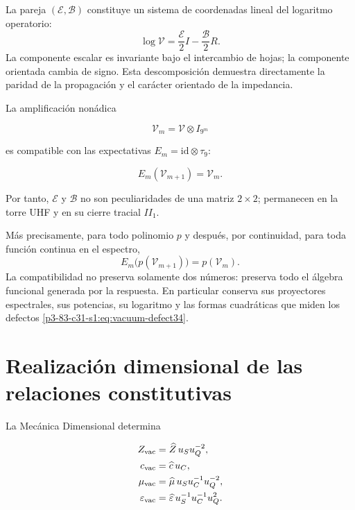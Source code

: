 La pareja \((\mathcal E,\mathcal B)\) constituye un sistema de coordenadas lineal del logaritmo
operatorio:
\begin{equation}
\log\mathcal V
=\frac{\mathcal E}{2}I-\frac{\mathcal B}{2}R.
\label{p3-83-c31-s1:eq:vacuum-log-decomposition}
\end{equation}
La componente escalar es invariante bajo el intercambio de hojas; la
componente orientada cambia de signo. Esta descomposici\'on demuestra
directamente la paridad de la propagaci\'on y el car\'acter orientado de la
impedancia.

La amplificaci\'on non\'adica

\[
\mathcal V_m=\mathcal V\otimes I_{9^m}
\]

es compatible con las expectativas \(E_m=\mathrm{id}\otimes\tau_9\):

\[
E_m(\mathcal V_{m+1})=\mathcal V_m.
\]

Por tanto, \(\mathcal E\) y \(\mathcal B\) no son peculiaridades de una matriz \(2\times2\); permanecen en la torre UHF y en su cierre tracial \(II_1\).

M\'as precisamente, para todo polinomio \(p\) y despu\'es, por continuidad,
para toda funci\'on continua en el espectro,
\begin{equation}
E_m\bigl(p(\mathcal V_{m+1})\bigr)=p(\mathcal V_m).
\label{p3-83-c31-s1:eq:vacuum-functional-refinement}
\end{equation}
La compatibilidad no preserva solamente dos n\'umeros: preserva todo el
\'algebra funcional generada por la respuesta. En particular conserva sus
proyectores espectrales, sus potencias, su logaritmo y las formas cuadr\'aticas
que miden los defectos \cref{p3-83-c31-s1:eq:vacuum-defect34}.

\section{Realizaci\'on dimensional de las relaciones constitutivas}

La Mec\'anica Dimensional determina

\begin{align}
Z_{\rm vac}&=\widehat Z\,u_Su_Q^{-2},\\
c_{\rm vac}&=\widehat c\,u_C,\\
\mu_{\rm vac}&=\widehat\mu\,u_Su_C^{-1}u_Q^{-2},\\
\varepsilon_{\rm vac}&=\widehat\varepsilon\,u_S^{-1}u_C^{-1}u_Q^2.
\label{p3-83-c31-s1:eq:vacuum-sections}
\end{align}

